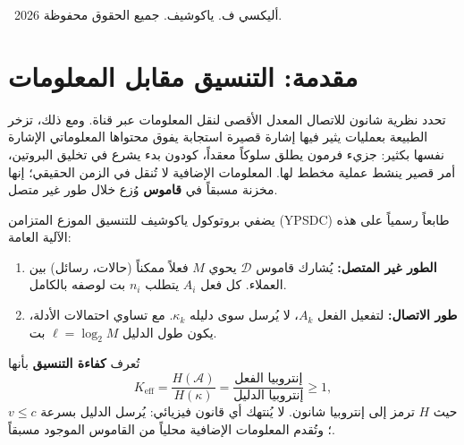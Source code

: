 \documentclass[12pt,a4paper]{article}
\begin{document}
\begin{titlepage}
\begin{abstract}
			كذلك نقدم فرضية متغيرة تختار عدد كم النيوترينو المعين \(N_{\nu} = -125\) (كتلة \(\approx 0.023\) eV) عبر تعظيم قدرة التنسيق الكلية لقطاع الفرميونات. هذا التنبؤ قابل للتكذيب وإذا تأكد فسيعزز النظرية.
		\end{abstract}
		
		\vspace{1cm}
		\textcopyright\ 2026 أليكسي ف. ياكوشيف. جميع الحقوق محفوظة.
	\end{titlepage}
	
	\tableofcontents
	\newpage
	
	\section{مقدمة: التنسيق مقابل المعلومات}
	\label{sec:intro}
	
	تحدد نظرية شانون للاتصال المعدل الأقصى لنقل المعلومات عبر قناة. ومع ذلك، تزخر الطبيعة بعمليات يثير فيها إشارة قصيرة استجابة يفوق محتواها المعلوماتي الإشارة نفسها بكثير: جزيء فرمون يطلق سلوكاً معقداً، كودون بدء يشرع في تخليق البروتين، أمر قصير ينشط عملية مخطط لها. المعلومات الإضافية لا تُنقل في الزمن الحقيقي؛ إنها مخزنة مسبقاً في \textbf{قاموس} وُزع خلال طور غير متصل.
	
	يضفي بروتوكول ياكوشيف للتنسيق الموزع المتزامن (YPSDC) طابعاً رسمياً على هذه الآلية العامة:
	\begin{enumerate}[label=(\roman*)]
		\item \textbf{الطور غير المتصل:} يُشارك قاموس \(\mathcal{D}\) يحوي \(M\) فعلاً ممكناً (حالات، رسائل) بين العملاء. كل فعل \(A_i\) يتطلب \(n_i\) بت لوصفه بالكامل.
		\item \textbf{طور الاتصال:} لتفعيل الفعل \(A_k\)، لا يُرسل سوى دليله \(\kappa_k\). مع تساوي احتمالات الأدلة، يكون طول الدليل \(\ell = \log_2 M\) بت.
	\end{enumerate}
	تُعرف \textbf{كفاءة التنسيق} بأنها
	\begin{equation}
		\boxed{K_{\mathrm{eff}} = \frac{H(\mathcal{A})}{H(\kappa)} = \frac{\text{إنتروبيا الفعل}}{\text{إنتروبيا الدليل}} \ge 1},
		\label{eq:keff-def}
	\end{equation}
	حيث \(H\) ترمز إلى إنتروبيا شانون. لا يُنتهك أي قانون فيزيائي: يُرسل الدليل بسرعة \(v \le c\)؛ وتُقدم المعلومات الإضافية محلياً من القاموس الموجود مسبقاً.
	
	\begin{center}
	\end{center}
	
\end{document}
